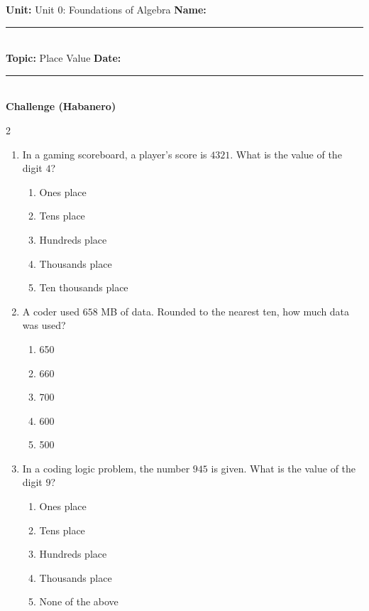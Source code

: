 \documentclass[10pt]{article}
\begin{document}
\enlargethispage{2.5cm}

\begin{tcolorbox}[colback=mainblue!5, colframe=mainblue, sharp corners, boxrule=0.5pt]
    \small \textbf{Unit:} Unit 0: Foundations of Algebra \hfill \textbf{Name:} \rule{3cm}{0.4pt} \\
    \small \textbf{Topic:} Place Value \hfill \textbf{Date:} \rule{2cm}{0.4pt} \\
    \centering \textbf{\large Challenge (Habanero)}
\end{tcolorbox}

\vspace{0.2cm}

\begin{multicols}{2}
\begin{enumerate}[label=\textbf{Q\arabic*.}, leftmargin=*, itemsep=6pt, parsep=0pt]

  \item \small In a gaming scoreboard, a player's score is $4321$. What is the value of the digit $4$?
  \begin{enumerate}[label=(\Alph*), leftmargin=0.6cm, nosep, itemsep=2pt]
    \item Ones place
    \item Tens place
    \item Hundreds place
    \item Thousands place
    \item Ten thousands place
  \end{enumerate}

  \item \small A coder used $658$ MB of data. Rounded to the nearest ten, how much data was used?
  \begin{enumerate}[label=(\Alph*), leftmargin=0.6cm, nosep, itemsep=2pt]
    \item 650
    \item 660
    \item 700
    \item 600
    \item 500
  \end{enumerate}

  \item \small In a coding logic problem, the number $945$ is given. What is the value of the digit $9$?
  \begin{enumerate}[label=(\Alph*), leftmargin=0.6cm, nosep, itemsep=2pt]
    \item Ones place
    \item Tens place
    \item Hundreds place
    \item Thousands place
    \item None of the above
  \end{enumerate}


\end{enumerate}
\end{multicols}
\end{document}
